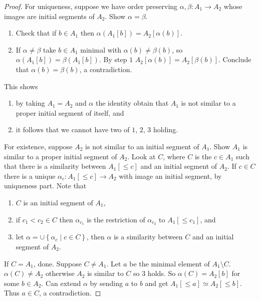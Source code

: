 \documentclass{article}
\newcommand{\rb}[1]{\left( #1 \right)}
\renewcommand{\sb}[1]{\left[ #1 \right]}
\newcommand{\cb}[1]{\left\{ #1 \right\}}
\theoremstyle{definition}\newtheorem{definition}{Definition}[subsection]
\theoremstyle{definition}\newtheorem{remark}[definition]{Remark}
\theoremstyle{definition}\newtheorem*{example}{Example}
\theoremstyle{definition}\newtheorem*{note}{Note}
\begin{document}
\begin{proof}
For uniqueness, suppose we have order preserving $ \alpha, \beta : A_1 \to A_2 $ whose images are initial segments of $ A_2 $. Show $ \alpha = \beta $.
\begin{enumerate}
\item Check that if $ b \in A_1 $ then $ \alpha\rb{A_1\sb{b}} = A_2\sb{\alpha\rb{b}} $.
\item If $ \alpha \ne \beta $ take $ b \in A_1 $ minimal with $ \alpha\rb{b} \ne \beta\rb{b} $, so $ \alpha\rb{A_1\sb{b}} = \beta\rb{A_1\sb{b}} $. By step $ 1 $ $ A_2\sb{\alpha\rb{b}} = A_2\sb{\beta\rb{b}} $. Conclude that $ \alpha\rb{b} = \beta\rb{b} $, a contradiction.
\end{enumerate}
This shows
\begin{enumerate}
\item by taking $ A_1 = A_2 $ and $ \alpha $ the identity obtain that $ A_1 $ is not similar to a proper initial segment of itself, and
\item it follows that we cannot have two of $ 1 $, $ 2 $, $ 3 $ holding.
\end{enumerate}
For existence, suppose $ A_2 $ is not similar to an initial segment of $ A_1 $. Show $ A_1 $ is similar to a proper initial segment of $ A_2 $. Look at $ C $, where $ C $ is the $ c \in A_1 $ such that there is a similarity between $ A_1\sb{\le c} $ and an initial segment of $ A_2 $. If $ c \in C $ there is a unique $ \alpha_c : A_1\sb{\le c} \to A_2 $ with image an initial segment, by uniqueness part. Note that
\begin{enumerate}
\item $ C $ is an initial segment of $ A_1 $,
\item if $ c_1 < c_2 \in C $ then $ \alpha_{c_1} $ is the restriction of $ \alpha_{c_2} $ to $ A_1\sb{\le c_1} $, and
\item let $ \alpha = \cup \cb{\alpha_c \mid c \in C} $, then $ \alpha $ is a similarity between $ C $ and an initial segment of $ A_2 $.
\end{enumerate}
If $ C = A_1 $, done. Suppose $ C \ne A_1 $. Let $ a $ be the minimal element of $ A_1 \setminus C $. $ \alpha\rb{C} \ne A_2 $ otherwise $ A_2 $ is similar to $ C $ so $ 3 $ holds. So $ \alpha\rb{C} = A_2\sb{b} $ for some $ b \in A_2 $. Can extend $ \alpha $ by sending $ a $ to $ b $ and get $ A_1\sb{\le a} \simeq A_2\sb{\le b} $. Thus $ a \in C $, a contradiction.
\end{proof}

\end{document}
